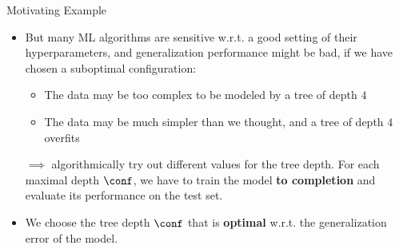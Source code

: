 \begin{frame}{Motivating Example}
\framebreak

\begin{itemize}
\vfill
\item But many ML algorithms are sensitive w.r.t. a good setting of their hyperparameters,
and generalization performance might be bad, if we have chosen a suboptimal configuration:
\begin{itemize}
\vfill
\item The data may be too complex to be modeled by a tree of depth $4$
\vfill
\item The data may be much simpler than we thought, and a tree of depth $4$ overfits
\end{itemize}
\vfill
\item[$\implies$] algorithmically try out different values for the tree depth. For each maximal depth $\conf$, we have to train the model \textbf{to completion} and evaluate its performance on the test set.
\vfill
\item We choose the tree depth $\conf$ that is \textbf{optimal} w.r.t. the generalization error of the model.
\end{itemize}


\end{frame}



